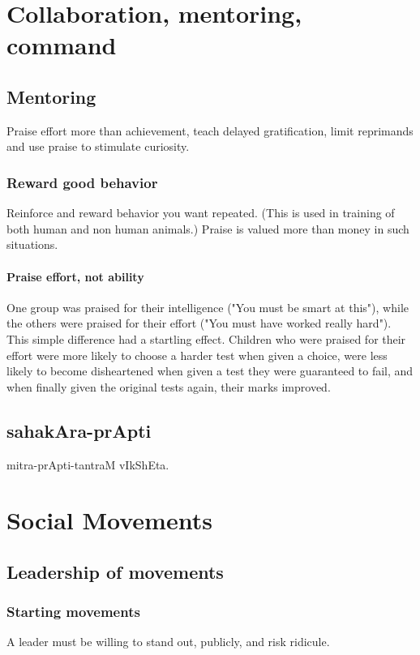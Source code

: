\documentclass[oneside, article]{memoir}
\begin{document}
\chapter{Collaboration, mentoring, command}
\section{Mentoring}
Praise effort more than achievement, teach delayed gratification, limit reprimands and use praise to stimulate curiosity.

\subsection{Reward good behavior}
Reinforce and reward behavior you want repeated. (This is used in training of both human and non human animals.) Praise is valued more than money in such situations.

\subsubsection{Praise effort, not ability}
One group was praised for their intelligence ("You must be smart at this"), while the others were praised for their effort ("You must have worked really hard"). This simple difference had a startling effect. Children who were praised for their effort were more likely to choose a harder test when given a choice, were less likely to become disheartened when given a test they were guaranteed to fail, and when finally given the original tests again, their marks improved. 

\section{sahakAra-prApti}
mitra-prApti-tantraM vIkShEta.

\chapter{Social Movements}
\section{Leadership of movements}
\subsection{Starting movements}
A leader must be willing to stand out, publicly, and risk ridicule.
\end{document}
